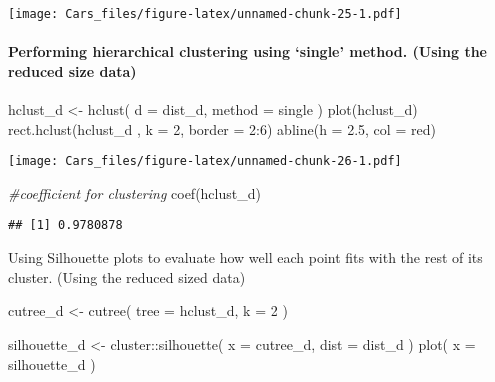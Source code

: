 \documentclass[
]{article}
\newenvironment{Shaded}{\begin{snugshade}}{\end{snugshade}}
\newcommand{\AttributeTok}[1]{\textcolor[rgb]{0.77,0.63,0.00}{#1}}
\newcommand{\CommentTok}[1]{\textcolor[rgb]{0.56,0.35,0.01}{\textit{#1}}}
\newcommand{\DecValTok}[1]{\textcolor[rgb]{0.00,0.00,0.81}{#1}}
\newcommand{\FloatTok}[1]{\textcolor[rgb]{0.00,0.00,0.81}{#1}}
\newcommand{\FunctionTok}[1]{\textcolor[rgb]{0.00,0.00,0.00}{#1}}
\newcommand{\NormalTok}[1]{#1}
\newcommand{\OtherTok}[1]{\textcolor[rgb]{0.56,0.35,0.01}{#1}}
\newcommand{\SpecialCharTok}[1]{\textcolor[rgb]{0.00,0.00,0.00}{#1}}
\newcommand{\StringTok}[1]{\textcolor[rgb]{0.31,0.60,0.02}{#1}}
\begin{document}
\texttt{[image: Cars\_files/figure-latex/unnamed-chunk-25-1.pdf]}

\hypertarget{performing-hierarchical-clustering-using-single-method.-using-the-reduced-size-data}{%
\paragraph{Performing hierarchical clustering using `single' method.
(Using the reduced size
data)}\label{performing-hierarchical-clustering-using-single-method.-using-the-reduced-size-data}}

\begin{Shaded}
\begin{Highlighting}[]
\NormalTok{hclust\_d }\OtherTok{\textless{}{-}} \FunctionTok{hclust}\NormalTok{(}
  \AttributeTok{d =}\NormalTok{ dist\_d,}
  \AttributeTok{method =} \StringTok{\textquotesingle{}single\textquotesingle{}}
\NormalTok{)}
\FunctionTok{plot}\NormalTok{(hclust\_d)}
\FunctionTok{rect.hclust}\NormalTok{(hclust\_d , }\AttributeTok{k =} \DecValTok{2}\NormalTok{, }\AttributeTok{border =} \DecValTok{2}\SpecialCharTok{:}\DecValTok{6}\NormalTok{)}
\FunctionTok{abline}\NormalTok{(}\AttributeTok{h =} \FloatTok{2.5}\NormalTok{, }\AttributeTok{col =} \StringTok{\textquotesingle{}red\textquotesingle{}}\NormalTok{)}
\end{Highlighting}
\end{Shaded}

\texttt{[image: Cars\_files/figure-latex/unnamed-chunk-26-1.pdf]}

\begin{Shaded}
\begin{Highlighting}[]
\CommentTok{\#coefficient for clustering}
\FunctionTok{coef}\NormalTok{(hclust\_d)}
\end{Highlighting}
\end{Shaded}

\begin{verbatim}
## [1] 0.9780878
\end{verbatim}

Using Silhouette plots to evaluate how well each point fits with the
rest of its cluster. (Using the reduced sized data)

\begin{Shaded}
\begin{Highlighting}[]
\NormalTok{cutree\_d }\OtherTok{\textless{}{-}} \FunctionTok{cutree}\NormalTok{(}
  \AttributeTok{tree =}\NormalTok{ hclust\_d,}
  \AttributeTok{k =} \DecValTok{2}
\NormalTok{)}

\NormalTok{silhouette\_d }\OtherTok{\textless{}{-}}\NormalTok{ cluster}\SpecialCharTok{::}\FunctionTok{silhouette}\NormalTok{(}
  \AttributeTok{x =}\NormalTok{ cutree\_d,}
  \AttributeTok{dist =}\NormalTok{ dist\_d}
\NormalTok{)}
\FunctionTok{plot}\NormalTok{(}
  \AttributeTok{x =}\NormalTok{ silhouette\_d}
\NormalTok{)}
\end{Highlighting}
\end{Shaded}
\end{document}
